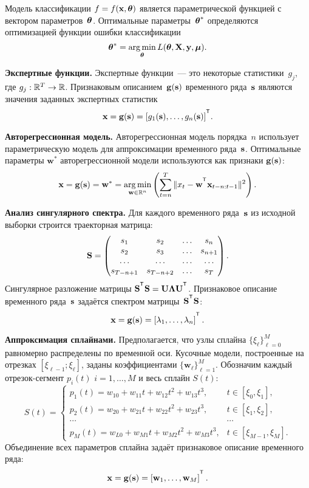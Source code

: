 \documentclass[11pt, a5paper]{dissert}
\begin{document}
Модель классификации $f=f(\mathbf{x}, \boldsymbol{\theta})$ является параметрической функцией с вектором параметров~$\boldsymbol{\theta}$. 
Оптимальные параметры~$\boldsymbol{\theta}^*$ определяются оптимизацией функции ошибки классификации
\begin{equation}
	\boldsymbol{\theta}^* = \mathop{\arg \min}\limits_{\boldsymbol{\theta}} L(\boldsymbol{\theta}, \mathbf{X}, \mathbf{y}, \boldsymbol{\mu}).
	\label{ch6:eq:optimal_classification_params}
\end{equation}

\textbf{Экспертные функции.}
Экспертные функции~--- это некоторые статистики~$g_j$, где $g_j: \mathbb{R}^T \rightarrow \mathbb{R}$.
Признаковым описанием~$\mathbf{g}(\mathbf{s})$ временного ряда~$\mathbf{s}$ являются значения заданных экспертных статистик
\[
	\bx = \mathbf{g}(\bs) = [g_1(\bs), \dots, g_n(\bs)]^{\T}.
\]

\textbf{Авторегрессионная модель.}
Авторегрессионная модель порядка~$n$ использует параметрическую модель для аппроксимации временного ряда~$\mathbf{s}$.
Оптимальные параметры $\mathbf{w}^*$ авторегрессионной модели используются как признаки $\mathbf{g}(\mathbf{s})$:
\begin{equation}
	\bx = \mathbf{g}(\bs) = \mathbf{w}^* = \argmin_{\mathbf{w} \in \bbR^{n}} \left( \sum_{t=n}^{T} \|x_t - \bw^{\T} \bx_{t - n: t-1} \|^2\right).
	\label{ch6:eq:autoregressive_description}
\end{equation}

\textbf{Анализ сингулярного спектра.}
Для каждого временного ряда~$\mathbf{s}$ из исходной выборки строится траекторная матрица:
\[
	\mathbf{S} = 
	\begin{pmatrix}
		s_1 & s_2 & \dots & s_n \\
		s_2 & s_3 & \dots & s_{n+1} \\
		\dots & \dots & \dots & \dots \\
		s_{T-n+1} & s_{T-n+2} & \dots & s_T
	\end{pmatrix}.
\]
Сингулярное разложение матрицы $\mathbf{S}^{\T} \mathbf{S} = \bU \boldsymbol{\Lambda} \bU^{\T}$.
Признаковое описание временного ряда~$\mathbf{s}$ задаётся спектром матрицы~$\bS^{\T} \bS$:
\[
	\bx = \mathbf{g}(\bs) = \left[\lambda_1, \dots, \lambda_n\right]^{\T}.
\]

\textbf{Аппроксимация сплайнами.}
Предполагается, что узлы сплайна $\{\xi_\ell\}_{\ell=0}^M$ равномерно распределены по временной оси.
Кусочные модели, построенные на отрезках $[\xi_{\ell-1}; \xi_{\ell}]$, заданы коэффициентами $\{\mathbf{w}_\ell\}_{\ell=1}^{M}$.
Обозначим каждый отрезок-сегмент $p_i(t)$ $i = 1, \dots, M$ и весь сплайн $S(t)$:
\begin{equation*}
	S(t) = \begin{cases}
		p_1(t) = w_{10} +w_{11}t + w_{12}t^2 + w_{13}t^3, & t\in [\xi_0, \xi_1],\\
		p_2(t) = w_{20} +w_{21}t + w_{22}t^2 + w_{23}t^3, & t\in [\xi_1, \xi_2],\\
		\cdots&\cdots \\
		p_{M}(t) = w_{L0} +w_{M1}t + w_{M2}t^2 + w_{M3}t^3, & t\in [\xi_{M-1}, \xi_M].					
	\end{cases}
\end{equation*}
Объединение всех параметров сплайна задаёт признаковое описание временного ряда:
\[
	\bx = \mathbf{g}(\bs) = \left[\mathbf{w}_1, \dots, \mathbf{w}_{M}\right]^{\T}.
\]
\end{document}
